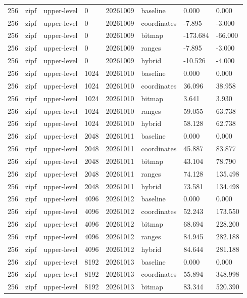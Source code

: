 \begin{tabular}{llllllll}
256 & zipf & upper-level & 0 & 20261009 & baseline & 0.000 & 0.000 \\
256 & zipf & upper-level & 0 & 20261009 & coordinates & -7.895 & -3.000 \\
256 & zipf & upper-level & 0 & 20261009 & bitmap & -173.684 & -66.000 \\
256 & zipf & upper-level & 0 & 20261009 & ranges & -7.895 & -3.000 \\
256 & zipf & upper-level & 0 & 20261009 & hybrid & -10.526 & -4.000 \\
256 & zipf & upper-level & 1024 & 20261010 & baseline & 0.000 & 0.000 \\
256 & zipf & upper-level & 1024 & 20261010 & coordinates & 36.096 & 38.958 \\
256 & zipf & upper-level & 1024 & 20261010 & bitmap & 3.641 & 3.930 \\
256 & zipf & upper-level & 1024 & 20261010 & ranges & 59.055 & 63.738 \\
256 & zipf & upper-level & 1024 & 20261010 & hybrid & 58.128 & 62.738 \\
256 & zipf & upper-level & 2048 & 20261011 & baseline & 0.000 & 0.000 \\
256 & zipf & upper-level & 2048 & 20261011 & coordinates & 45.887 & 83.877 \\
256 & zipf & upper-level & 2048 & 20261011 & bitmap & 43.104 & 78.790 \\
256 & zipf & upper-level & 2048 & 20261011 & ranges & 74.128 & 135.498 \\
256 & zipf & upper-level & 2048 & 20261011 & hybrid & 73.581 & 134.498 \\
256 & zipf & upper-level & 4096 & 20261012 & baseline & 0.000 & 0.000 \\
256 & zipf & upper-level & 4096 & 20261012 & coordinates & 52.243 & 173.550 \\
256 & zipf & upper-level & 4096 & 20261012 & bitmap & 68.694 & 228.200 \\
256 & zipf & upper-level & 4096 & 20261012 & ranges & 84.945 & 282.188 \\
256 & zipf & upper-level & 4096 & 20261012 & hybrid & 84.644 & 281.188 \\
256 & zipf & upper-level & 8192 & 20261013 & baseline & 0.000 & 0.000 \\
256 & zipf & upper-level & 8192 & 20261013 & coordinates & 55.894 & 348.998 \\
256 & zipf & upper-level & 8192 & 20261013 & bitmap & 83.344 & 520.390 \\

\end{tabular}
